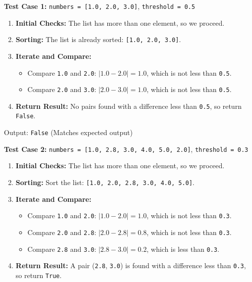 \documentclass[11pt]{article}
\begin{document}
\begin{tcolorbox}[breakable, colback=white, colframe=black!70, boxrule=0.5pt, arc=2pt, left=4mm, right=4mm, top=3mm, bottom=3mm]
\textbf{Test Case 1:} \texttt{numbers = [1.0, 2.0, 3.0]}, \texttt{threshold = 0.5}

\begin{enumerate}
    \item \textbf{Initial Checks:} The list has more than one element, so we proceed.
    \item \textbf{Sorting:} The list is already sorted: \texttt{[1.0, 2.0, 3.0]}.
    \item \textbf{Iterate and Compare:}
    \begin{itemize}
        \item Compare \texttt{1.0} and \texttt{2.0}: $|1.0 - 2.0| = 1.0$, which is not less than \texttt{0.5}.
        \item Compare \texttt{2.0} and \texttt{3.0}: $|2.0 - 3.0| = 1.0$, which is not less than \texttt{0.5}.
    \end{itemize}
    \item \textbf{Return Result:} No pairs found with a difference less than \texttt{0.5}, so return \texttt{False}.
\end{enumerate}

Output: \texttt{False} (Matches expected output)

\textbf{Test Case 2:} \texttt{numbers = [1.0, 2.8, 3.0, 4.0, 5.0, 2.0]}, \texttt{threshold = 0.3}

\begin{enumerate}
    \item \textbf{Initial Checks:} The list has more than one element, so we proceed.
    \item \textbf{Sorting:} Sort the list: \texttt{[1.0, 2.0, 2.8, 3.0, 4.0, 5.0]}.
    \item \textbf{Iterate and Compare:}
    \begin{itemize}
        \item Compare \texttt{1.0} and \texttt{2.0}: $|1.0 - 2.0| = 1.0$, which is not less than \texttt{0.3}.
        \item Compare \texttt{2.0} and \texttt{2.8}: $|2.0 - 2.8| = 0.8$, which is not less than \texttt{0.3}.
        \item Compare \texttt{2.8} and \texttt{3.0}: $|2.8 - 3.0| = 0.2$, which is less than \texttt{0.3}.
    \end{itemize}
    \item \textbf{Return Result:} A pair (\texttt{2.8}, \texttt{3.0}) is found with a difference less than \texttt{0.3}, so return \texttt{True}.
\end{enumerate}


\end{tcolorbox}
\end{document}
